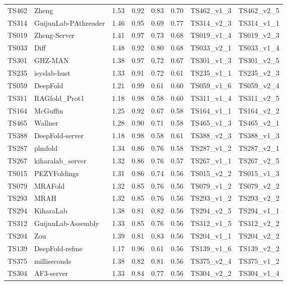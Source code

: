 \begin{longtable}{llllllll}
TS462 & Zheng & 1.53 & 0.92 & 0.83 & 0.70 & TS462\_v1\_3 & TS462\_v2\_5 \\ 
TS314 & GuijunLab-PAthreader & 1.46 & 0.95 & 0.69 & 0.77 & TS314\_v2\_3 & TS314\_v1\_1 \\ 
TS019 & Zheng-Server & 1.41 & 0.97 & 0.73 & 0.68 & TS019\_v1\_4 & TS019\_v2\_3 \\ 
TS033 & Diff & 1.48 & 0.92 & 0.80 & 0.68 & TS033\_v2\_1 & TS033\_v1\_4 \\ 
TS301 & GHZ-MAN & 1.38 & 0.97 & 0.72 & 0.67 & TS301\_v1\_3 & TS301\_v2\_5 \\ 
TS235 & isyslab-hust & 1.33 & 0.91 & 0.72 & 0.61 & TS235\_v1\_1 & TS235\_v2\_3 \\ 
TS059 & DeepFold & 1.21 & 0.99 & 0.61 & 0.60 & TS059\_v1\_6 & TS059\_v2\_4 \\ 
TS311 & RAGfold\_Prot1 & 1.18 & 0.98 & 0.58 & 0.60 & TS311\_v1\_4 & TS311\_v2\_5 \\ 
TS164 & McGuffin & 1.25 & 0.92 & 0.67 & 0.58 & TS164\_v1\_1 & TS164\_v2\_2 \\ 
TS465 & Wallner & 1.28 & 0.90 & 0.71 & 0.58 & TS465\_v1\_3 & TS465\_v2\_1 \\ 
TS388 & DeepFold-server & 1.18 & 0.98 & 0.58 & 0.61 & TS388\_v2\_3 & TS388\_v1\_3 \\ 
TS287 & plmfold & 1.34 & 0.86 & 0.76 & 0.58 & TS287\_v1\_2 & TS287\_v2\_1 \\ 
TS267 & kiharalab\_server & 1.32 & 0.86 & 0.76 & 0.57 & TS267\_v1\_1 & TS267\_v2\_5 \\ 
TS015 & PEZYFoldings & 1.31 & 0.86 & 0.74 & 0.56 & TS015\_v2\_2 & TS015\_v1\_3 \\ 
TS079 & MRAFold & 1.32 & 0.85 & 0.76 & 0.56 & TS079\_v1\_2 & TS079\_v2\_2 \\ 
TS293 & MRAH & 1.32 & 0.85 & 0.76 & 0.56 & TS293\_v1\_2 & TS293\_v2\_2 \\ 
TS294 & KiharaLab & 1.38 & 0.81 & 0.82 & 0.56 & TS294\_v2\_5 & TS294\_v1\_1 \\ 
TS312 & GuijunLab-Assembly & 1.33 & 0.85 & 0.76 & 0.56 & TS312\_v1\_5 & TS312\_v2\_2 \\ 
TS204 & Zou & 1.39 & 0.81 & 0.83 & 0.56 & TS204\_v1\_1 & TS204\_v2\_2 \\ 
TS139 & DeepFold-refine & 1.17 & 0.96 & 0.61 & 0.56 & TS139\_v1\_6 & TS139\_v2\_2 \\ 
TS375 & milliseconds & 1.38 & 0.82 & 0.81 & 0.56 & TS375\_v2\_4 & TS375\_v1\_2 \\ 
TS304 & AF3-server & 1.33 & 0.84 & 0.77 & 0.56 & TS304\_v2\_2 & TS304\_v1\_4 \\ 

\end{longtable}
